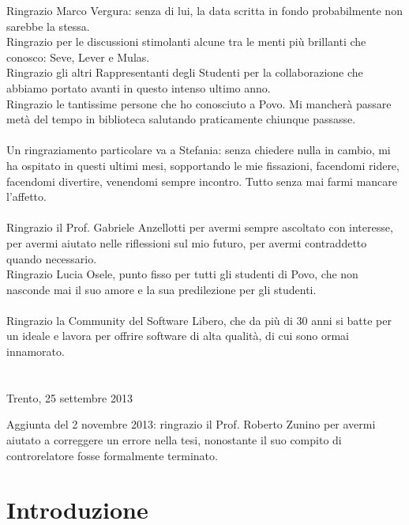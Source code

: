 \documentclass[12pt,a4paper]{report}
\theoremstyle{definition}
\begin{document}
Ringrazio Marco Vergura: senza di lui, la data scritta in fondo probabilmente non sarebbe la stessa.\\
Ringrazio per le discussioni stimolanti alcune tra le menti più brillanti che conosco: Seve, Lever e Mulas.\\
Ringrazio gli altri Rappresentanti degli Studenti per la collaborazione che abbiamo portato avanti in questo intenso ultimo anno.\\
Ringrazio le tantissime persone che ho conosciuto a Povo. Mi mancherà passare metà del tempo in biblioteca salutando praticamente chiunque passasse.\\
\\
Un ringraziamento particolare va a Stefania: senza chiedere nulla in cambio, mi ha ospitato in questi ultimi mesi, sopportando le mie fissazioni, facendomi ridere, facendomi divertire, venendomi sempre incontro. Tutto senza mai farmi mancare l'affetto.\\
\\
Ringrazio il Prof. Gabriele Anzellotti per avermi sempre ascoltato con interesse, per avermi aiutato nelle riflessioni sul mio futuro, per avermi contraddetto quando necessario.
\\
Ringrazio Lucia Osele, punto fisso per tutti gli studenti di Povo, che non nasconde mai il suo amore e la sua predilezione per gli studenti.\\
\\
Ringrazio la Community del Software Libero, che da più di 30 anni si batte per un ideale e lavora per offrire software di alta qualità, di cui sono ormai innamorato.\\
\\
\\
Trento, 25 settembre 2013

\vfill

Aggiunta del 2 novembre 2013: ringrazio il Prof. Roberto Zunino per avermi aiutato a correggere un errore nella tesi, nonostante il suo compito di controrelatore fosse formalmente terminato.







\newpage

\tableofcontents


\chapter*{Introduzione} 
\end{document}
